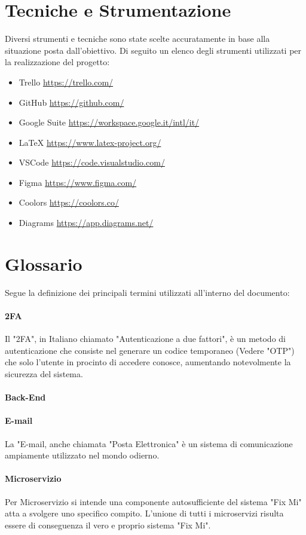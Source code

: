 \documentclass{report}
\begin{document}
\chapter{Tecniche e Strumentazione}
Diversi strumenti e tecniche sono state scelte accuratamente in base alla situazione posta dall’obiettivo. Di seguito un elenco degli strumenti utilizzati per la realizzazione del progetto:

\begin{itemize}
	\item Trello \qquad \url{https://trello.com/}
	\item GitHub \qquad \url{https://github.com/}
	\item Google Suite \qquad \url{https://workspace.google.it/intl/it/}
	\item LaTeX \qquad \url{https://www.latex-project.org/}
	\item VSCode \qquad \url{https://code.visualstudio.com/}
	\item Figma \qquad \url{https://www.figma.com/}
	\item Coolors \qquad \url{https://coolors.co/}
	\item Diagrams \qquad \url{https://app.diagrams.net/}
\end{itemize}

\chapter{Glossario}
Segue la definizione dei principali termini utilizzati all'interno del documento:

\subsubsection*{2FA}
Il "2FA", in Italiano chiamato "Autenticazione a due fattori", è un metodo di autenticazione che consiste nel generare un codice temporaneo (Vedere "OTP") che solo l'utente in procinto di accedere conosce, aumentando notevolmente la sicurezza del sistema.
\subsubsection*{Back-End}
\subsubsection*{E-mail}
La "E-mail, anche chiamata "Posta Elettronica" è un sistema di comunicazione ampiamente utilizzato nel mondo odierno.
\subsubsection*{Microservizio}
Per Microservizio si intende una componente autosufficiente del sistema "Fix Mi" atta a svolgere uno specifico compito. L'unione di tutti i microservizi risulta essere di conseguenza il vero e proprio sistema "Fix Mi".
\end{document}
